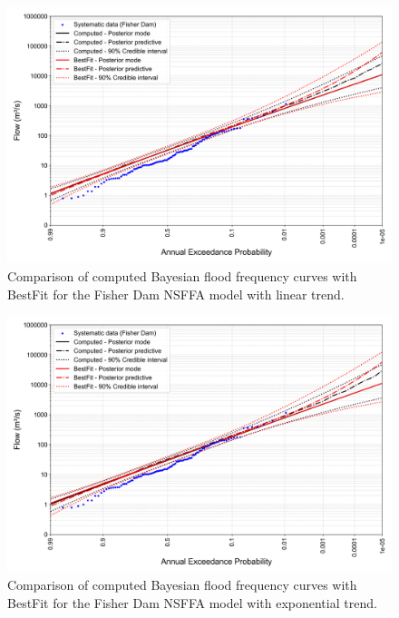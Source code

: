 \newpage
\begin{figure}[htp]
    \centering
    \includegraphics[width=1\linewidth]{_plots/OCD_bayesian_flood_quantiles_lp3_linear_mu.png}
    \caption{Comparison of computed Bayesian flood frequency curves with BestFit for the Fisher Dam NSFFA model with linear trend.}
    \label{fig:OCD_bayesian_flood_quantiles_lp3_linear_mu}
\end{figure}

\begin{figure}[htp]
    \centering
    \includegraphics[width=1\linewidth]{_plots/OCD_bayesian_flood_quantiles_lp3_exponential_mu.png}
    \caption{Comparison of computed Bayesian flood frequency curves with BestFit for the Fisher Dam NSFFA model with exponential trend. }
\label{fig:OCD_bayesian_flood_quantiles_lp3_exponential_mu}
\end{figure}

\FloatBarrier
